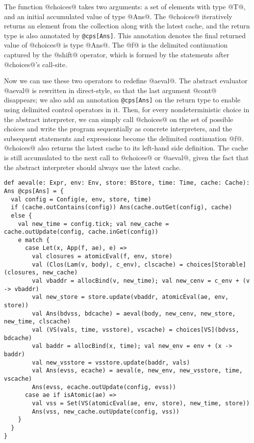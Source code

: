 \documentclass[acmsmall]{acmart}\settopmatter{}
\begin{document}
The function @choices@ takes two arguments: a set of elements with type @T@, 
and an initial accumulated value of type @Ans@.
The @choices@ iteratively returns an element from the collection along with the 
latest cache, and the return type is also annotated by \verb|@cps[Ans]|. 
This annotation denotes the final returned value of @choices@ is type @Ans@.
The @f@ is the delimited continuation captured by the @shift@ operator, which
is formed by the statements after @choices@'s call-site.

Now we can use these two operators to redefine @aeval@. The abstract evaluator @aeval@ is
rewritten in direct-style, so that the last argument @cont@ disappears; we also add an 
annotation \verb|@cps[Ans]| on the return type to enable using delimited control operators 
in it.
Then, for every nondeterministic choice in the abstract interpreter, we can simply call 
@choices@ on the set of possible choices and write the program sequentially as concrete 
interpreters, and the subsequent statements and expressions become the delimited continuation
@f@. @choices@ also returns the latest cache to its left-hand side definition.
The cache is still accumulated to the next call to @choices@ or @aeval@, 
given the fact that the abstract interpreter should always use the latest cache.

\begin{lstlisting}
def aeval(e: Expr, env: Env, store: BStore, time: Time, cache: Cache): Ans @cps[Ans] = {
  val config = Config(e, env, store, time)
  if (cache.outContains(config)) Ans(cache.outGet(config), cache)
  else {
    val new_time = config.tick; val new_cache = cache.outUpdate(config, cache.inGet(config))
    e match {
      case Let(x, App(f, ae), e) =>
        val closures = atomicEval(f, env, store)
        val (Clos(Lam(v, body), c_env), clscache) = choices[Storable](closures, new_cache)
        val vbaddr = allocBind(v, new_time); val new_cenv = c_env + (v -> vbaddr)
        val new_store = store.update(vbaddr, atomicEval(ae, env, store))
        val Ans(bdvss, bdcache) = aeval(body, new_cenv, new_store, new_time, clscache)
        val (VS(vals, time, vsstore), vscache) = choices[VS](bdvss, bdcache)
        val baddr = allocBind(x, time); val new_env = env + (x -> baddr)
        val new_vsstore = vsstore.update(baddr, vals)
        val Ans(evss, ecache) = aeval(e, new_env, new_vsstore, time, vscache)
        Ans(evss, ecache.outUpdate(config, evss))
      case ae if isAtomic(ae) =>
        val vss = Set(VS(atomicEval(ae, env, store), new_time, store))
        Ans(vss, new_cache.outUpdate(config, vss))
    }
  }
}
\end{lstlisting}
\end{document}
